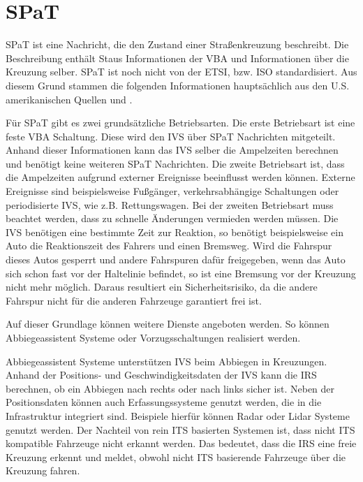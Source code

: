 \section{SPaT\label{sec:spat}}
\ac{SPaT} ist eine Nachricht, die den Zustand einer Straßenkreuzung beschreibt. Die Beschreibung enthält Staus Informationen der \ac{VBA} und Informationen über die Kreuzung selber. \ac{SPaT} ist noch nicht von der \ac{ETSI}, bzw. \ac{ISO} standardisiert. Aus diesem Grund stammen die folgenden Informationen hauptsächlich aus den U.S. amerikanischen Quellen \cite{usSpat} und \cite{usCaliforniaSpat}. 

Für \ac{SPaT} gibt es zwei grundsätzliche Betriebsarten. Die erste Betriebsart ist eine feste \ac{VBA} Schaltung. Diese wird den \ac{IVS} über \ac{SPaT} Nachrichten mitgeteilt. Anhand dieser Informationen kann das \ac{IVS} selber die Ampelzeiten berechnen und benötigt keine  weiteren \ac{SPaT} Nachrichten. Die zweite Betriebsart ist, dass die Ampelzeiten aufgrund externer Ereignisse beeinflusst werden können. Externe Ereignisse sind beispielsweise Fußgänger, verkehrsabhängige Schaltungen oder periodisierte \ac{IVS}, wie z.B. Rettungswagen. Bei der zweiten Betriebsart muss beachtet werden, dass zu schnelle Änderungen vermieden werden müssen. Die \ac{IVS} benötigen eine bestimmte Zeit zur Reaktion, so benötigt beispielsweise ein Auto die Reaktionszeit des Fahrers und einen Bremsweg. Wird die Fahrspur dieses Autos gesperrt und andere Fahrspuren dafür freigegeben, wenn das Auto sich schon fast vor der Haltelinie befindet, so ist eine Bremsung vor der Kreuzung nicht mehr möglich. Daraus resultiert ein Sicherheitsrisiko, da die andere Fahrspur nicht für die anderen Fahrzeuge garantiert frei ist. 

Auf dieser Grundlage können weitere Dienste angeboten werden. So können Abbiegeassistent Systeme oder Vorzugsschaltungen realisiert werden. 

 Abbiegeassistent Systeme unterstützen \ac{IVS} beim Abbiegen in Kreuzungen. Anhand der Positions- und Geschwindigkeitsdaten der \ac{IVS} kann die \ac{IRS} berechnen, ob ein Abbiegen nach rechts oder nach links sicher ist. Neben der Positionsdaten können auch Erfassungssysteme genutzt werden, die in die Infrastruktur integriert sind. Beispiele hierfür können \ac{Radar} oder \ac{Lidar} Systeme genutzt werden. Der Nachteil von rein \ac{ITS} basierten Systemen ist, dass nicht \ac{ITS} kompatible Fahrzeuge nicht erkannt werden. Das bedeutet, dass die \ac{IRS} eine freie Kreuzung erkennt und meldet, obwohl nicht \ac{ITS} basierende Fahrzeuge über die Kreuzung fahren. 
 
